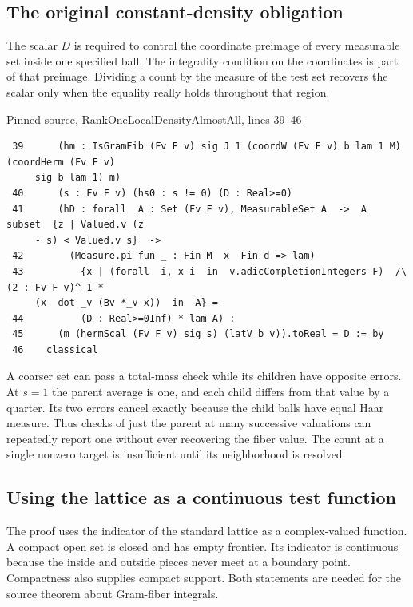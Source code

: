 \documentclass[12pt,letterpaper]{article}
\begin{document}
\clearpage\subsection*{The original constant-density obligation}

The scalar \(D\) is required to control the coordinate preimage of every measurable set inside one specified ball. The integrality condition on the coordinates is part of that preimage. Dividing a count by the measure of the test set recovers the scalar only when the equality really holds throughout that region.

\par\smallskip\href{https://github.com/nousentllc/riemann-hypothesis/blob/40e56bab026552e089d7afcfeff08d2defb9c005/src/CompanionTheory/SpectralGeometry/LocalGlobalProofs/AdelicAnalysis/RankOneLocalDensityAlmostAll.lean#L39-L46}{\sffamily\small Pinned source, RankOneLocalDensityAlmostAll, lines 39--46}\par

{\footnotesize\begin{verbatim}
 39      (hm : IsGramFib (Fv F v) sig J 1 (coordW (Fv F v) b lam 1 M) (coordHerm (Fv F v)
     sig b lam 1) m)
 40      (s : Fv F v) (hs0 : s != 0) (D : Real>=0)
 41      (hD : forall  A : Set (Fv F v), MeasurableSet A  ->  A  subset  {z | Valued.v (z
     - s) < Valued.v s}  ->
 42        (Measure.pi fun _ : Fin M  x  Fin d => lam)
 43          {x | (forall  i, x i  in  v.adicCompletionIntegers F)  /\  (2 : Fv F v)^-1 *
     (x  dot _v (Bv *_v x))  in  A} =
 44          (D : Real>=0Inf) * lam A) :
 45      (m (hermScal (Fv F v) sig s) (latV b v)).toReal = D := by
 46    classical
\end{verbatim}
}

A coarser set can pass a total-mass check while its children have opposite errors. At \(s=1\) the parent average is one, and each child differs from that value by a quarter. Its two errors cancel exactly because the child balls have equal Haar measure. Thus checks of just the parent at many successive valuations can repeatedly report one without ever recovering the fiber value. The count at a single nonzero target is insufficient until its neighborhood is resolved.

\clearpage\subsection*{Using the lattice as a continuous test function}

The proof uses the indicator of the standard lattice as a complex-valued function. A compact open set is closed and has empty frontier. Its indicator is continuous because the inside and outside pieces never meet at a boundary point. Compactness also supplies compact support. Both statements are needed for the source theorem about Gram-fiber integrals.
\end{document}
